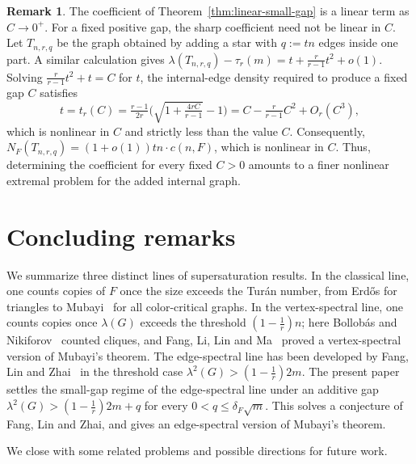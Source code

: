 \documentclass[11pt,a4paper]{article}
\theoremstyle{definition}
\newtheorem{remark}{Remark}
\theoremstyle{plain}
\renewcommand{\le}{\leqslant}
\begin{document}
\begin{remark}
\label{rem:fixed-gap-caveat}
The coefficient of Theorem~\ref{thm:linear-small-gap} is a linear term as $C\to 0^+$.
 For a fixed positive gap, the sharp coefficient need not be linear in $C$.  
 Let $T_{n,r,q}$ be the graph obtained by adding a star with $q:=tn$ edges inside one part. 
 A similar calculation gives $\lambda (T_{n,r,q}) -\tau_r(m)=t+\tfrac{r}{r-1}t^2+o(1)$. Solving $\tfrac{r}{r-1}t^2 +t =C$ for $t$, the internal-edge density required to produce a fixed gap $C$ satisfies  
\[
  t=t_r(C)=\tfrac{r-1}{2r}\Big(\sqrt{1+\tfrac{4rC}{r-1}}-1\Big)
  =C-\tfrac{r}{r-1}C^2+O_r(C^3),
\]
which is nonlinear in $C$ and strictly less than the value $C$. 
Consequently, $N_F(T_{n,r,q}) = (1+o(1))tn\cdot c(n,F)$, which is nonlinear in $C$. Thus, determining the  coefficient for every fixed $C>0$ amounts to a finer nonlinear extremal problem for the added internal graph.
\end{remark}


\section{Concluding remarks}

\label{sec:concluding} 

We summarize three distinct lines of supersaturation results. In the classical line, one counts copies of $F$ once the size exceeds the
Tur\'an number, from Erd\H{o}s for triangles to Mubayi~\cite{Mub2010} for all color-critical graphs. In
the vertex-spectral line, one counts copies once $\lambda(G)$ exceeds
the threshold $(1- \frac{1}{r})n$; here Bollob\'as and Nikiforov~\cite{BN2007jctb}
counted cliques, and Fang, Li, Lin and Ma~\cite{FLLM2025} proved a vertex-spectral version of Mubayi's theorem. 
The edge-spectral line has  been developed by 
Fang, Lin and Zhai~\cite{FLZ} in the threshold case $\lambda^2(G) > (1- \frac{1}{r})2m$. 
The present paper settles the small-gap regime of the edge-spectral line under an additive gap $\lambda^2(G) > (1- \frac{1}{r})2m +q$ for every $0< q\le \delta_F \sqrt{m}$. This solves a conjecture of Fang, Lin and Zhai, and  gives an edge-spectral version of Mubayi's theorem. 

\smallskip 
We close with some related problems and possible directions for future work. 
\end{document}
